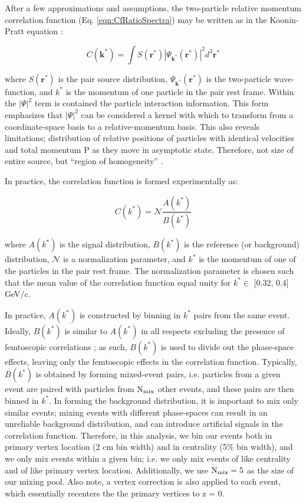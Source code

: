\documentclass[ALICE,manyauthors]{cernphprep}
\newcommand{\kstar}{$k^{*}$\xspace}
\begin{document}
After a few approximations and assumptions, the two-particle relative momentum correlation function (Eq. \ref{eqn:CfRatioSpectra}) may be written as in the Koonin-Pratt equation \cite{Koonin:1977fh, Pratt:1990zq}:

\begin{equation}
 C(\mathbf{k^{*}}) = \int S(\mathbf{r^{*}})|\Psi_{\mathbf{k^{*}}}(\mathbf{r^{*}})|^{2}d^{3}\mathbf{r^{*}}
\label{eqn:KooninPrattEqn}
\end{equation}

where $S(\mathbf{r^{*}})$ is the pair source distribution, $\Psi_{\mathbf{k^{*}}}(\mathbf{r^{*}})$ is the two-particle wave-function, and \kstar is the momentum of one particle in the pair rest frame.
Within the $|\Psi|^{2}$ term is contained the particle interaction information.
This form emphasizes that $|\Psi|^{2}$ can be considered a kernel with which to transform from a coordinate-space basis to a relative-momentum basis.
This also reveals limitations; distribution of relative positions of particles with identical velocities and total momentum P as they move in asymptotic state.  Therefore, not size of entire source, but ``region of homogeneity'' \cite{Akkelin:1995gh}.

In practice, the correlation function is formed experimentally as:

\begin{equation}
  C(k^{*}) = \mathcal{N}\frac{A(k^{*})}{B(k^{*})}
\label{eqn:CfExp}
\end{equation}


where $A(k^{*})$ is the signal distribution, $B(k^{*})$ is the reference (or background) distribution, $\mathcal{N}$ is a normalization parameter, and $k^{*}$ is the momentum of one of the particles in the pair rest frame.  The normalization parameter is chosen such that the mean value of the correlation function equal unity for \kstar $\in$ [0.32, 0.4] GeV/$c$.


In practice, $A(k^{*})$ is constructed by binning in \kstar pairs from the same event.
Ideally, $B(k^{*})$ is similar to $A(k^{*})$ in all respects excluding the presence of femtoscopic correlations \cite{Lisa:2005dd}; as such, $B(k^{*})$ is used to divide out the phase-space effects, leaving only the femtoscopic effects in the correlation function. 
Typically, $B(k^{*})$ is obtained by forming mixed-event pairs, i.e. particles from a given event are paired with particles from $\rm N_{mix}$ other events, and these pairs are then binned in \kstar.
In forming the background distribution, it is important to mix only similar events; mixing events with different phase-spaces can result in an unreliable background distribution, and can introduce artificial signals in the correlation function.
Therefore, in this analysis, we bin our events both in primary vertex location (2 cm bin width) and in centrality (5\% bin width), and we only mix events within a given bin; i.e. we only mix events of like centrality and of like primary vertex location.
Additionally, we use $\rm N_{mix} = 5$ as the size of our mixing pool.
Also note, a vertex correction is also applied to each event, which essentially recenters the the primary vertices to z = 0.
\end{document}
